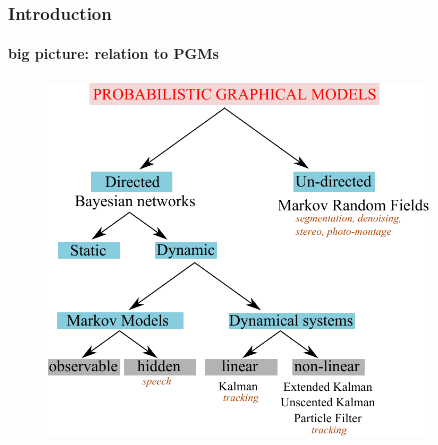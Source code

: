 \begin{frame}
\frametitle{Introduction}
\framesubtitle{big picture: relation to PGMs}
\logoCSIPCPL\mypagenum
	\begin{figure}
		\includegraphics[width=0.9\textwidth]{figs/PRML_PGM_overview.pdf}
	\end{figure}
\end{frame}


